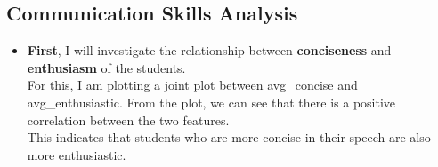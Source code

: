 \documentclass{article}
\begin{document}
\subsection{Communication Skills Analysis}
\begin{itemize}
    \item \textbf{First}, I will investigate the relationship between \textbf{conciseness} and \textbf{enthusiasm} of the students.\\ 
    For this, I am plotting a joint plot between avg\_concise and avg\_enthusiastic. From the plot, we can see that there is a positive correlation between the two features.\\
    
    This indicates that students who are more concise in their speech are also more enthusiastic.


\end{itemize}
\end{document}
